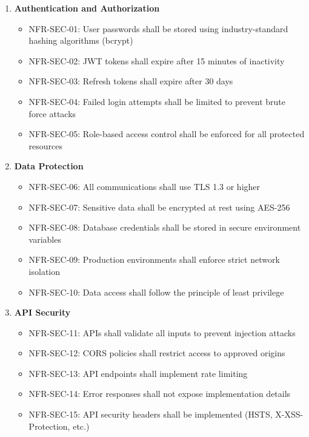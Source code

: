 \begin{enumerate}
   \item \textbf{Authentication and Authorization}
   \begin{itemize}
      \item NFR-SEC-01: User passwords shall be stored using industry-standard hashing algorithms (bcrypt)
      \item NFR-SEC-02: JWT tokens shall expire after 15 minutes of inactivity
      \item NFR-SEC-03: Refresh tokens shall expire after 30 days
      \item NFR-SEC-04: Failed login attempts shall be limited to prevent brute force attacks
      \item NFR-SEC-05: Role-based access control shall be enforced for all protected resources
   \end{itemize}

   \item \textbf{Data Protection}
   \begin{itemize}
      \item NFR-SEC-06: All communications shall use TLS 1.3 or higher
      \item NFR-SEC-07: Sensitive data shall be encrypted at rest using AES-256
      \item NFR-SEC-08: Database credentials shall be stored in secure environment variables
      \item NFR-SEC-09: Production environments shall enforce strict network isolation
      \item NFR-SEC-10: Data access shall follow the principle of least privilege
   \end{itemize}

   \item \textbf{API Security}
   \begin{itemize}
      \item NFR-SEC-11: APIs shall validate all inputs to prevent injection attacks
      \item NFR-SEC-12: CORS policies shall restrict access to approved origins
      \item NFR-SEC-13: API endpoints shall implement rate limiting
      \item NFR-SEC-14: Error responses shall not expose implementation details
      \item NFR-SEC-15: API security headers shall be implemented (HSTS, X-XSS-Protection, etc.)
   \end{itemize}


\end{enumerate}
